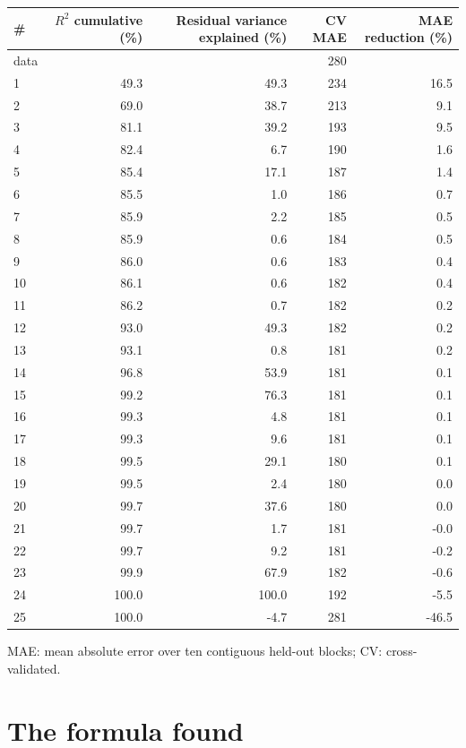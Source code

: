 \documentclass[11pt,a4paper]{article}
\begin{document}
\begin{center}
\begin{tabular}{lrrrr}
\toprule
\# & $R^2$ cumulative (\%) & Residual variance explained (\%) & CV MAE & MAE reduction (\%) \\
\midrule
data & & & 280 & \\
1 & 49.3 & 49.3 & 234 & 16.5 \\
2 & 69.0 & 38.7 & 213 & 9.1 \\
3 & 81.1 & 39.2 & 193 & 9.5 \\
4 & 82.4 & 6.7 & 190 & 1.6 \\
5 & 85.4 & 17.1 & 187 & 1.4 \\
6 & 85.5 & 1.0 & 186 & 0.7 \\
7 & 85.9 & 2.2 & 185 & 0.5 \\
8 & 85.9 & 0.6 & 184 & 0.5 \\
9 & 86.0 & 0.6 & 183 & 0.4 \\
10 & 86.1 & 0.6 & 182 & 0.4 \\
11 & 86.2 & 0.7 & 182 & 0.2 \\
12 & 93.0 & 49.3 & 182 & 0.2 \\
13 & 93.1 & 0.8 & 181 & 0.2 \\
14 & 96.8 & 53.9 & 181 & 0.1 \\
15 & 99.2 & 76.3 & 181 & 0.1 \\
16 & 99.3 & 4.8 & 181 & 0.1 \\
17 & 99.3 & 9.6 & 181 & 0.1 \\
18 & 99.5 & 29.1 & 180 & 0.1 \\
19 & 99.5 & 2.4 & 180 & 0.0 \\
20 & 99.7 & 37.6 & 180 & 0.0 \\
21 & 99.7 & 1.7 & 181 & -0.0 \\
22 & 99.7 & 9.2 & 181 & -0.2 \\
23 & 99.9 & 67.9 & 182 & -0.6 \\
24 & 100.0 & 100.0 & 192 & -5.5 \\
25 & 100.0 & -4.7 & 281 & -46.5 \\
\bottomrule
\end{tabular}
\end{center}

MAE: mean absolute error over ten contiguous held-out blocks; CV: cross-validated.

\section*{The formula found}
\end{document}
